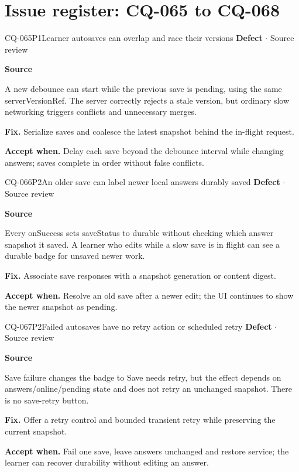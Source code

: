 \section*{Issue register: CQ-065 to CQ-068}
\begin{finding}{CQ-065}{P1}{Learner autosaves can overlap and race their versions}
\textbf{Defect} $\cdot$ Source review\par
\textbf{Source}\quad{}\par
A new debounce can start while the previous save is pending, using the same serverVersionRef. The server correctly rejects a stale version, but ordinary slow networking triggers conflicts and unnecessary merges.\par
\textbf{Fix.} Serialize saves and coalesce the latest snapshot behind the in-flight request.\par
\textbf{Accept when.} Delay each save beyond the debounce interval while changing answers; saves complete in order without false conflicts.
\end{finding}
\begin{finding}{CQ-066}{P2}{An older save can label newer local answers durably saved}
\textbf{Defect} $\cdot$ Source review\par
\textbf{Source}\quad{}\par
Every onSuccess sets saveStatus to durable without checking which answer snapshot it saved. A learner who edits while a slow save is in flight can see a durable badge for unsaved newer work.\par
\textbf{Fix.} Associate save responses with a snapshot generation or content digest.\par
\textbf{Accept when.} Resolve an old save after a newer edit; the UI continues to show the newer snapshot as pending.
\end{finding}
\begin{finding}{CQ-067}{P2}{Failed autosaves have no retry action or scheduled retry}
\textbf{Defect} $\cdot$ Source review\par
\textbf{Source}\quad{}\par
Save failure changes the badge to Save needs retry, but the effect depends on answers/online/pending state and does not retry an unchanged snapshot. There is no save-retry button.\par
\textbf{Fix.} Offer a retry control and bounded transient retry while preserving the current snapshot.\par
\textbf{Accept when.} Fail one save, leave answers unchanged and restore service; the learner can recover durability without editing an answer.
\end{finding}
